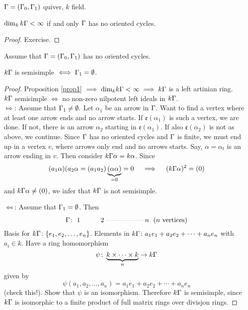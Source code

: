 \begin{prop}\label{prop1}
  $\Gamma = (\Gamma_0,\Gamma_1)$ quiver, $k$ field.
\begin{center}
  $\dim_kk\Gamma < \infty$ if and only $\Gamma$ has no oriented cycles.
\end{center}
\end{prop}
\begin{proof}
  Exercise.
\end{proof}

\begin{prop}
  Assume that $\Gamma=(\Gamma_0,\Gamma_1)$ has no oriented cycles. 
\begin{center}
$k\Gamma$ is semisimple $\iff \Gamma_1 = \emptyset$.
\end{center}
\end{prop}

\begin{proof}
  Proposition \ref{prop1} $ \implies \text{dim}_kk\Gamma < \infty \implies k\Gamma$ is a left artinian ring. \\
  $k\Gamma$ semisimple $\iff $ no non-zero nilpotent left ideals in $k\Gamma$.\\

  $\Mapsto$: Assume that $\Gamma_1\neq\emptyset.$ Let $\alpha_1$ be an
  arrow in $\Gamma$. Want to find a vertex where at least one arrow ends
  and no arrow starts. If $\mathfrak{e}(\alpha_1)$ is such a vertex,
  we are done. If not, there is an arrow $\alpha_2$ starting in
  $\mathfrak{e}(\alpha_1)$.  If also $\mathfrak{e}(\alpha_2)$ is not
  as above, we continue. Since $\Gamma$ has no oriented cycles and $\Gamma$ is
  finite, we must end up in a vertex $ v$, where arrows only end and
  no arrows starts. Say, $\alpha = \alpha_t$ is an arrow ending in
  $v$. Then consider $k\Gamma\alpha = k\alpha$.  Since
  \[(a_1\alpha)(a_2\alpha = (a_1a_2)\underbrace{(\alpha\alpha)}_{=0} =
  0\quad \implies \quad (k\Gamma\alpha)^2=(0)
\]
and $k\Gamma\alpha \neq (0)$, we infer that $k\Gamma$ is not semisimple.

$\Mapsfrom$: Assume that $\Gamma_1 = \emptyset$. Then 
\[\G\colon \xymatrix{1 & 2\ar@{..}[rr] & &  n} \text{ ($n$ vertices)}\]
  Basis for $k\Gamma\colon \{e_1, e_2, \ldots, e_n\}$. Elements in
  $k\Gamma\colon a_1e_1 + a_2e_2 + \cdots + a_ne_n$ with $a_i \in k$. Have
  a ring homomorphism
\[\psi\colon \underbrace{k \times \cdots \times k}_{n}  \rightarrow k\Gamma\]
  given by
\[\psi(a_1,a_2,\ldots,a_n)=a_1e_1 + a_2e_2+ \cdots + a_ne_n\] 
(check this!).  Show that $\psi$ is an isomorphism. Therefore $k\Gamma$ is
  semisimple, since $k\Gamma$ is isomorphic to a finite product of full
  matrix rings over divisjon rings.
\end{proof}

